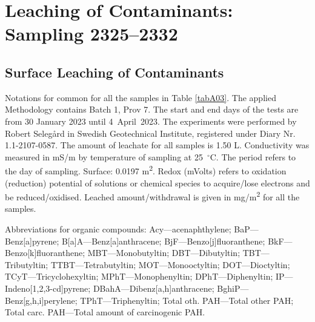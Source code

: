 \documentclass[algorithms,article,accept,pdftex,moreauthors]{Definitions/mdpi}
\begin{document}
\section[\appendixname~\thesection]{Leaching of Contaminants: Sampling 2325--2332}\label{AppB1}
\subsection[\appendixname~\thesubsection]{Surface Leaching of Contaminants}

Notations for common for all the samples in Table \ref{tabA03}. The applied Methodology contains Batch 1, Prov 7. The start and end days of the tests are from 30 January 2023 until \mbox{4 April 2023}. The experiments were performed by Robert Selegård in Swedish Geotechnical Institute, registered under Diary Nr. 1.1-2107-0587. The amount of leachate for all samples is 1.50 L. Conductivity was measured in mS/m by temperature of sampling at 25~$^\circ$C. The period refers to the day of sampling. Surface: 0.0197 m\textsuperscript{2}. Redox (mVolts) refers to oxidation (reduction) potential of solutions or chemical species to acquire/lose electrons and be reduced/oxidised. Leached amount/withdrawal is given in mg/m\textsuperscript{2} for all the samples. 

Abbreviations for organic compounds: Acy---acenaphthylene; BaP---Benz[a]pyrene; B[a]A---Benz[a]anthracene; BjF---Benzo[j]fluoranthene; BkF---Benzo[k]fluoranthene; MBT---Monobutyltin; DBT---Dibutyltin; TBT---Tributyltin; TTBT---Tetrabutyltin; \linebreak MOT---Monooctyltin; DOT---Dioctyltin; TCyT---Tricyclohexyltin; MPhT---Monophenyltin; DPhT---Diphenyltin; IP---Indeno[1,2,3-cd]pyrene; DBahA---Dibenz[a,h]anthracene; BghiP---Benz[g,h,i]perylene; TPhT---Triphenyltin; Total oth. PAH---Total other PAH; Total carc. PAH---Total amount of carcinogenic PAH. 
\end{document}
